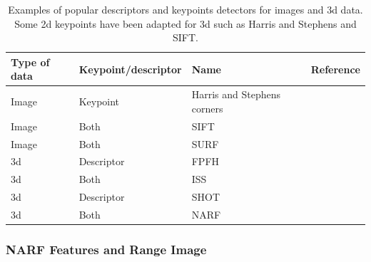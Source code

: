\begin{table}[H]
    \centering
    \begin{tabular}{@{}llll@{}}
        \toprule
        \textbf{Type of data}  & \textbf{Keypoint/descriptor} & \textbf{Name}               & \textbf{Reference} \\
        \hline
        Image                  & Keypoint                     & Harris and Stephens corners & \cite{Harris1988}  \\
        Image                  & Both                         & SIFT                        & \cite{Lowe2004}    \\
        Image                  & Both                         & SURF                        & \cite{Bay2006}     \\
        \gls*{3d}              & Descriptor                   & FPFH                        & \cite{Rusu2009}    \\
        \gls*{3d}              & Both                         & ISS                         & \cite{Yu2009}      \\
        \gls*{3d}              & Descriptor                   & SHOT                        & \cite{Tombari2010} \\
        \gls*{3d}              & Both                         & NARF                        & \cite{Steder2011a} \\
        \bottomrule
    \end{tabular}
    \caption{ Examples of popular descriptors and keypoints detectors for images and \gls*{3d} data. Some \gls*{2d} keypoints have been adapted for \gls*{3d} such as Harris and Stephens and SIFT.}
    \label{tab:chap_slam_features_examples}
\end{table}

\subsubsection{NARF Features and Range Image}
\label{ssub:NARF Features and Range Image}

